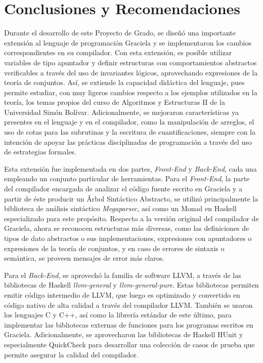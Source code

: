 \chapter*{Conclusiones y Recomendaciones}
\label{conclusiones}

Durante el desarrollo de este Proyecto de Grado, se diseñó una importante
extensión al lenguaje de programación Graciela y se implementaron los cambios
correspondientes en su compilador. Con esta extensión, es posible utilizar
variables de tipo apuntador y definir estructuras con comportamientos abstractos
verificables a través del uso de invariantes lógicos, aprovechando expresiones
de la teoría de conjuntos. Así, se extiende la capacidad didáctica del lenguaje,
pues permite estudiar, con muy ligeros cambios respecto a los ejemplos
utilizados en la teoría, los temas propios del curso de Algoritmos y Estructuras
II de la Universidad Simón Bolívar. Adicionalmente, se mejoraron características
ya presentes en el lenguaje y en el compilador, como la manipulación de
arreglos, el uso de cotas para las subrutinas y la escritura de
cuantificaciones, siempre con la intención de apoyar las prácticas disciplinadas
de programación a través del uso de estrategias formales.

Esta extensión fue implementada en dos partes, \textit{Front-End} y
\textit{Back-End}, cada una empleando un conjunto particular de herramientas.
Para el \textit{Front-End}, la parte del compilador encargada de analizar el
código fuente escrito en Graciela y a partir de éste producir un Árbol
Sintáctico Abstracto, se utilizó principalmente la biblioteca de análisis
sintáctico \textit{Megaparsec}, así como un Monad en Haskell especializado para
este propósito. Respecto a la versión original del compilador de Graciela, ahora
se reconocen estructuras más diversas, como las definiciones de tipos de dato
abstractos o sus implementaciones, expresiones con apuntadores o expresiones de
la teoría de conjuntos, y en caso de errores de sintaxis o semántica, se proveen
mensajes de error más claros.

Para el \textit{Back-End}, se aprovechó la familia de software LLVM, a través de
las bibliotecas de Haskell \textit{llvm-general} y \textit{llvm-general-pure}.
Estas bibliotecas permiten emitir código intermedio de LLVM, que luego es
optimizado y convertido en código nativo de alta calidad a través del compilador
LLVM. También se usaron los lenguajes C y C++, así como la librería estándar de
este último, para implementar las bibliotecas externas de funciones para los
programas escritos en Graciela. Adicionalmente, se aprovecharon las bibliotecas
de Haskell HUnit y especialmente QuickCheck para desarrollar una colección de
casos de prueba que permite asegurar la calidad del compilador.

